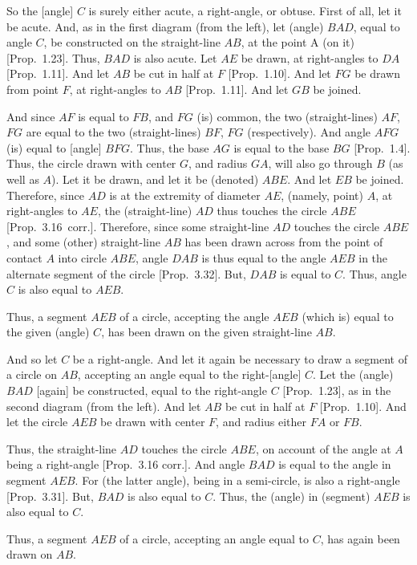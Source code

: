 \begin{Parallel}{}{}
{So the [angle] $C$ is surely either acute, a right-angle, or obtuse. First of all,
let it be acute. And, as in the first diagram (from the left), let (angle) $BAD$,
equal to angle $C$,  be
constructed  on the straight-line $AB$,  at the point A (on it)
[Prop.~1.23]. Thus, $BAD$ is also acute. Let $AE$ be drawn, at
right-angles to $DA$ [Prop.~1.11]. And let $AB$ be cut in half
at $F$ [Prop.~1.10]. And let $FG$ be drawn from point $F$, at right-angles to $AB$
[Prop.~1.11]. And let $GB$ be joined.

And since $AF$ is equal to $FB$, and $FG$ (is) common, the two (straight-lines)
$AF$, $FG$ are equal to the two (straight-lines) $BF$, $FG$ (respectively). And
angle $AFG$ (is) equal to [angle] $BFG$. Thus, the base $AG$ is equal to the
base $BG$ [Prop.~1.4]. Thus, the circle drawn with center $G$, and radius $GA$, will also go through $B$ (as well as $A$). Let it be drawn, and let it be (denoted) $ABE$. And let $EB$ be joined. Therefore, since $AD$ is at the extremity
of diameter $AE$,  (namely, point) $A$,  at right-angles to $AE$, the (straight-line)
$AD$ thus touches the circle $ABE$ [Prop.~3.16~corr.]. Therefore,
since some straight-line $AD$ touches the circle $ABE$, and some (other)
straight-line $AB$ has been drawn across from the point of contact $A$ into circle
$ABE$, angle $DAB$ is thus equal to the angle $AEB$ in the alternate segment of the
circle [Prop.~3.32]. But, $DAB$ is equal to $C$. Thus,
angle $C$ is also equal to $AEB$.

Thus, a segment $AEB$ of a circle, accepting the angle $AEB$ (which is) equal to the
given (angle) $C$, has been drawn on the given straight-line $AB$.

And so let $C$ be a right-angle. And let it again be necessary to draw  a segment
of a circle on $AB$, accepting an angle equal to the right-[angle] $C$. Let the (angle)
$BAD$ [again] be constructed, equal to the right-angle $C$ [Prop.~1.23], as in the second diagram (from the left). And let $AB$ be cut in half at $F$ [Prop.~1.10]. And let the circle $AEB$ be
drawn with center $F$, and radius either  $FA$ or $FB$.

Thus, the straight-line $AD$ touches the circle $ABE$, on account of the angle at $A$ being a right-angle [Prop.~3.16 corr.]. And angle $BAD$ is equal
to the angle in segment $AEB$. For (the latter angle), being in a semi-circle, is also a right-angle [Prop.~3.31]. But,  $BAD$ is also equal to $C$. Thus, the (angle) in (segment) $AEB$ is also equal to $C$.

Thus, a segment $AEB$ of a circle, accepting an angle equal to $C$, has again been
drawn on $AB$.

}
\end{Parallel}
